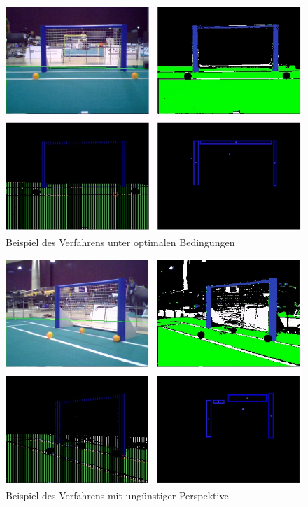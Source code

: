 \documentclass[a4paper,12pt]{article}
\begin{document}
\begin{figure}[H]
\includegraphics[scale=0.8]{example-detection3.png}
\caption{Beispiel des Verfahrens unter optimalen Bedingungen}
\label{fig:example3}
\end{figure}

\begin{figure}[H]
\includegraphics[scale=0.8]{example-detection4.png}
\caption{Beispiel des Verfahrens mit ungünstiger Perspektive}
\label{fig:example4}
\end{figure}
\end{document}
